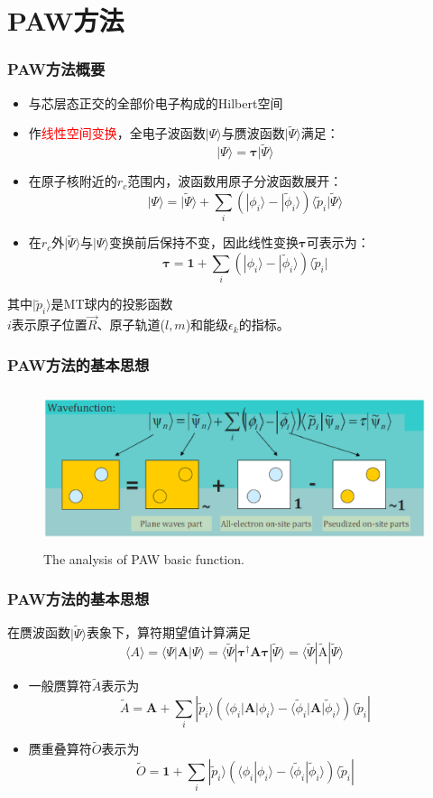 \section{\rm{PAW}方法}
\frame
{
	\frametitle{\textrm{PAW}方法概要}
\begin{itemize}
	\item 与芯层态正交的全部价电子构成的\textrm{Hilbert}空间%
	\item 作\textcolor{red}{线性空间变换}，全电子波函数$|\Psi\rangle$与赝波函数$|\tilde\Psi\rangle$满足：
		$$|\Psi\rangle=\mathbf{\tau|}\tilde\Psi\rangle$$
	\item 在原子核附近的$r_c$范围内，波函数用原子分波函数展开：
	$$|\Psi\rangle=|\tilde\Psi\rangle+\sum_i(|\phi_i\rangle-|\tilde\phi_i\rangle)\langle\tilde p_i|\tilde\Psi\rangle$$
	\item 在$r_c$外$|\tilde\Psi\rangle$与$|\Psi\rangle$变换前后保持不变，因此线性变换$\mathbf{\tau}$可表示为：
	$$\mathbf{\tau}=\mathbf{1}+\sum_i(|\phi_i\rangle-|\tilde\phi_i\rangle)\langle\tilde p_i|$$
\end{itemize}
其中$|\tilde p_i\rangle$是\textrm{MT}球内的投影函数\\
$i$表示原子位置$\vec R$、原子轨道($l,m$)和能级$\epsilon_k$的指标。
}

\frame
{
	\frametitle{\textrm{PAW}方法的基本思想}
	\vspace{10pt}
\begin{figure}[h!]
\centering
\includegraphics[height=1.8in,width=4.in,viewport=30 210 570 440,clip]{Figures/PAW_projector.eps}
\caption{\tiny \textrm{The analysis of PAW basic function.}}%
\label{PAW_baisc}
\end{figure}
}

\frame
{
\frametitle{\textrm{PAW}方法的基本思想}
	在赝波函数$|\tilde\Psi\rangle$表象下，算符期望值计算满足$$\langle A \rangle=\langle\Psi|\mathbf{A}|\Psi\rangle=\langle\tilde\Psi|\mathbf{\tau}^{\dag}\mathbf{A}\mathbf{\tau}|\tilde\Psi\rangle=\langle\tilde\Psi|\tilde{\mathrm{A}}|\tilde\Psi\rangle$$
\begin{itemize}
	\item 一般赝算符$\tilde A$表示为
		$$\tilde A=\mathbf{A}+\sum_i|\tilde p_i\rangle(\langle\phi_i|\mathbf{A}|\phi_i\rangle-\langle\tilde\phi_i|\mathbf{A}|\tilde\phi_i\rangle)\langle\tilde p_i|$$
	\item 赝重叠算符$\tilde O$表示为
		$$\tilde O=\mathbf{1}+\sum_i|\tilde p_i\rangle(\langle\phi_i|\phi_i\rangle-\langle\tilde\phi_i|\tilde\phi_i\rangle)\langle\tilde p_i|$$
\end{itemize}
}

